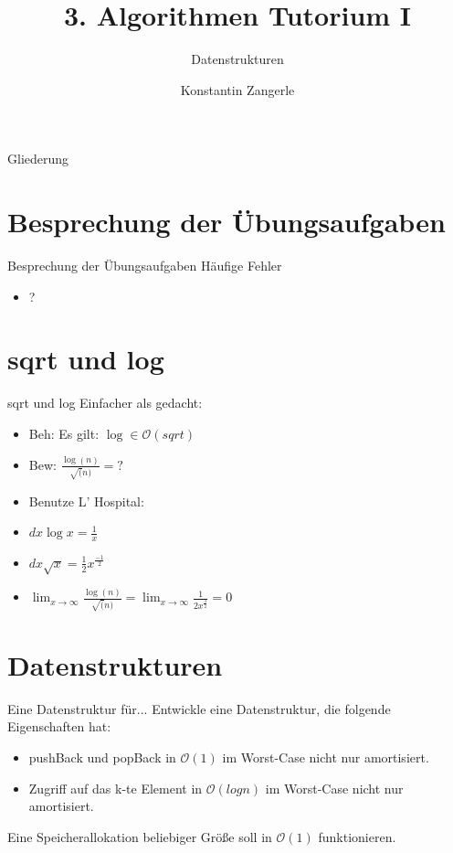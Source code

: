 \documentclass[18pt]{beamer}
\title[Algo I Tut]{3. Algorithmen Tutorium I}
\subtitle{Datenstrukturen}
\author[Zangerle]{Konstantin Zangerle}
\institute{Institut für Theoretische Informatik}
\newcommand{\Oh}{\mathcal{O}}
\begin{document}

\begin{frame}
\titlepage
\end{frame}

\begin{frame}{Gliederung}
 \tableofcontents
\end{frame}

\section{Besprechung der Übungsaufgaben}
\begin{frame}{Besprechung der Übungsaufgaben}
Häufige Fehler
\begin{itemize}
 \item ?
\end{itemize}

\end{frame}

\section{sqrt und log}
\begin{frame}{sqrt und log}
Einfacher als gedacht: \pause
 \begin{itemize}
  \item Beh: Es gilt: $\log \in \Oh(sqrt)$
  \item Bew: $\frac{\log(n)}{\sqrt(n)} = ?$ \pause
  \item Benutze L' Hospital:
  \item $dx \log x = \frac{1}{x}$
  \item $dx \sqrt x = \frac{1}{2} x^\frac{-1}{2}$
  \item $\lim_{x \to \infty} \frac{\log(n)}{\sqrt(n)} = \lim_{x \to \infty} \frac{1}{2 x^\frac{3}{2}} = 0$
 \end{itemize}

\end{frame}

\section{Datenstrukturen}

\begin{frame}{Eine Datenstruktur für...}
 Entwickle eine Datenstruktur, die folgende Eigenschaften hat:
 \begin{itemize}
  \item pushBack und popBack in $\Oh(1)$ im Worst-Case nicht nur amortisiert.
  \item Zugriff auf das k-te Element in $\Oh(log n)$ im Worst-Case nicht nur amortisiert.
 \end{itemize}
Eine Speicherallokation beliebiger Größe soll in $\Oh(1)$ funktionieren.
\end{frame}
\end{document}
